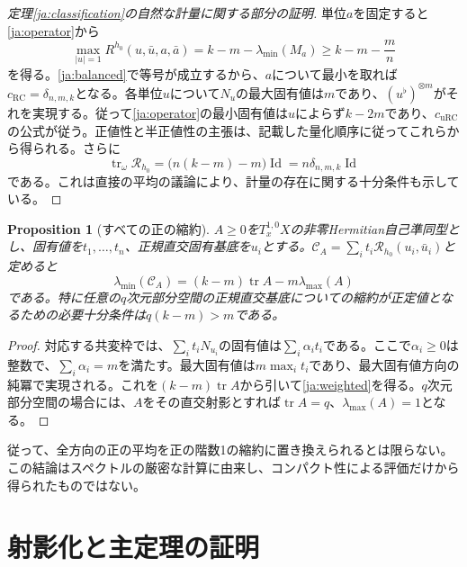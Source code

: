 \documentclass[12pt]{amsart}
\newtheorem{prop}[thm]{Proposition}
\theoremstyle{definition}
\theoremstyle{remark}
\numberwithin{equation}{section}
\DeclareMathOperator{\tr}{tr}
\DeclareMathOperator{\Id}{Id}
\newcommand{\urc}{\mathrm{uRC}}
\newcommand{\rc}{\mathrm{RC}}
\newcommand{\cst}{\delta_{n,m,k}}
\newcommand{\jref}[1]{\eqref{ja:#1}}
\begin{document}
\begin{proof}[定理\ref{ja:classification}の自然な計量に関する部分の証明]
単位$a$を固定すると\jref{operator}から
\begin{equation}\label{ja:optimization}
\max_{|u|=1}R^{h_0}(u,\bar u,a,\bar a)
=k-m-\lambda_{\min}(M_a)\ge k-m-\frac mn
\end{equation}
を得る。\jref{balanced}で等号が成立するから、$a$について最小を取れば$c_{\rc}=\cst$となる。各単位$u$について$N_u$の最大固有値は$m$であり、$(u^\flat)^{\otimes m}$がそれを実現する。従って\jref{operator}の最小固有値は$u$によらず$k-2m$であり、$c_{\urc}$の公式が従う。正値性と半正値性の主張は、記載した量化順序に従ってこれらから得られる。さらに
\begin{equation}\label{ja:mean}
\tr_\omega\mathcal R_{h_0}
=\bigl(n(k-m)-m\bigr)\Id=n\cst\Id
\end{equation}
である。これは直接の平均の議論により、計量の存在に関する十分条件も示している。
\end{proof}

\begin{prop}[すべての正の縮約]\label{ja:contraction}
$A\ge0$を$T_x^{1,0}X$の非零Hermitian自己準同型とし、固有値を$t_1,\ldots,t_n$、正規直交固有基底を$u_i$とする。$\mathcal C_A=\sum_i t_i\mathcal R_{h_0}(u_i,\bar u_i)$と定めると
\begin{equation}\label{ja:weighted}
\lambda_{\min}(\mathcal C_A)
=(k-m)\tr A-m\lambda_{\max}(A)
\end{equation}
である。特に任意の$q$次元部分空間の正規直交基底についての縮約が正定値となるための必要十分条件は$q(k-m)>m$である。
\end{prop}

\begin{proof}
対応する共変枠では、$\sum_i t_iN_{u_i}$の固有値は$\sum_i\alpha_i t_i$である。ここで$\alpha_i\ge0$は整数で、$\sum_i\alpha_i=m$を満たす。最大固有値は$m\max_i t_i$であり、最大固有値方向の純冪で実現される。これを$(k-m)\tr A$から引いて\jref{weighted}を得る。$q$次元部分空間の場合には、$A$をその直交射影とすれば$\tr A=q$、$\lambda_{\max}(A)=1$となる。
\end{proof}

従って、全方向の正の平均を正の階数1の縮約に置き換えられるとは限らない。この結論はスペクトルの厳密な計算に由来し、コンパクト性による評価だけから得られたものではない。

\section{射影化と主定理の証明}
\end{document}
